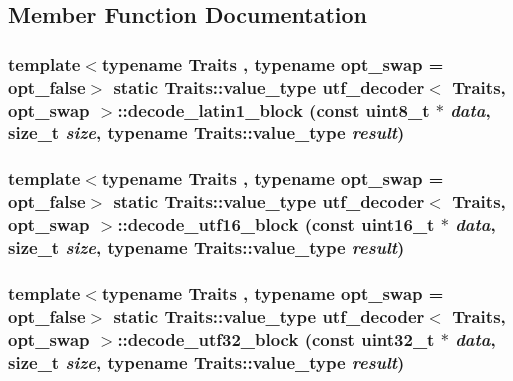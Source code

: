 \subsection{Member Function Documentation}
\hypertarget{structutf__decoder_a3f728755fa7cc552e30e8d8776cad1ce}{
\subsubsection[{decode\_\-latin1\_\-block}]{\setlength{\rightskip}{0pt plus 5cm}template$<$typename Traits , typename opt\_\-swap  = opt\_\-false$>$ static Traits::value\_\-type {\bf utf\_\-decoder}$<$ Traits, opt\_\-swap $>$::decode\_\-latin1\_\-block (const uint8\_\-t $\ast$ {\em data}, \/  size\_\-t {\em size}, \/  typename Traits::value\_\-type {\em result})}}
\label{structutf__decoder_a3f728755fa7cc552e30e8d8776cad1ce}
\hypertarget{structutf__decoder_ac22afd983ac79318f0e7d07669bda8d1}{
\subsubsection[{decode\_\-utf16\_\-block}]{\setlength{\rightskip}{0pt plus 5cm}template$<$typename Traits , typename opt\_\-swap  = opt\_\-false$>$ static Traits::value\_\-type {\bf utf\_\-decoder}$<$ Traits, opt\_\-swap $>$::decode\_\-utf16\_\-block (const uint16\_\-t $\ast$ {\em data}, \/  size\_\-t {\em size}, \/  typename Traits::value\_\-type {\em result})}}
\label{structutf__decoder_ac22afd983ac79318f0e7d07669bda8d1}
\hypertarget{structutf__decoder_a8bed41cc707328e8d8ab91fd7c3c943e}{
\subsubsection[{decode\_\-utf32\_\-block}]{\setlength{\rightskip}{0pt plus 5cm}template$<$typename Traits , typename opt\_\-swap  = opt\_\-false$>$ static Traits::value\_\-type {\bf utf\_\-decoder}$<$ Traits, opt\_\-swap $>$::decode\_\-utf32\_\-block (const uint32\_\-t $\ast$ {\em data}, \/  size\_\-t {\em size}, \/  typename Traits::value\_\-type {\em result})}}
